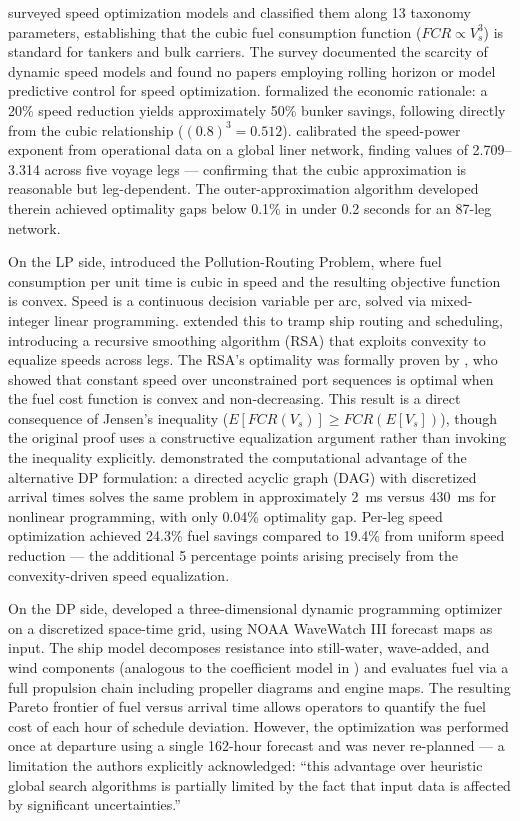 \documentclass[review,authoryear]{elsarticle}  %
\begin{document}
\citet{Psaraftis2013} surveyed speed optimization models and classified them along 13 taxonomy parameters, establishing that the cubic fuel consumption function ($FCR \propto V_s^3$) is standard for tankers and bulk carriers. The survey documented the scarcity of dynamic speed models and found no papers employing rolling horizon or model predictive control for speed optimization. \citet{Ronen2011} formalized the economic rationale: a 20\% speed reduction yields approximately 50\% bunker savings, following directly from the cubic relationship ($(0.8)^3 = 0.512$). \citet{Wang2012} calibrated the speed-power exponent from operational data on a global liner network, finding values of 2.709--3.314 across five voyage legs --- confirming that the cubic approximation is reasonable but leg-dependent. The outer-approximation algorithm developed therein achieved optimality gaps below 0.1\% in under 0.2 seconds for an 87-leg network.

On the LP side, \citet{Bektas2011} introduced the Pollution-Routing Problem, where fuel consumption per unit time is cubic in speed and the resulting objective function is convex. Speed is a continuous decision variable per arc, solved via mixed-integer linear programming. \citet{Norstad2011} extended this to tramp ship routing and scheduling, introducing a recursive smoothing algorithm (RSA) that exploits convexity to equalize speeds across legs. The RSA's optimality was formally proven by \citet{Hvattum2013}, who showed that constant speed over unconstrained port sequences is optimal when the fuel cost function is convex and non-decreasing. This result is a direct consequence of Jensen's inequality ($E[FCR(V_s)] \geq FCR(E[V_s])$), though the original proof uses a constructive equalization argument rather than invoking the inequality explicitly. \citet{Fagerholt2010} demonstrated the computational advantage of the alternative DP formulation: a directed acyclic graph (DAG) with discretized arrival times solves the same problem in approximately 2~ms versus 430~ms for nonlinear programming, with only 0.04\% optimality gap. Per-leg speed optimization achieved 24.3\% fuel savings compared to 19.4\% from uniform speed reduction --- the additional 5 percentage points arising precisely from the convexity-driven speed equalization.

On the DP side, \citet{Zaccone2018} developed a three-dimensional dynamic programming optimizer on a discretized space-time grid, using NOAA WaveWatch III forecast maps as input. The ship model decomposes resistance into still-water, wave-added, and wind components (analogous to the coefficient model in \citet{Yang2020}) and evaluates fuel via a full propulsion chain including propeller diagrams and engine maps. The resulting Pareto frontier of fuel versus arrival time allows operators to quantify the fuel cost of each hour of schedule deviation. However, the optimization was performed once at departure using a single 162-hour forecast and was never re-planned --- a limitation the authors explicitly acknowledged: ``this advantage over heuristic global search algorithms is partially limited by the fact that input data is affected by significant uncertainties.''
\end{document}
